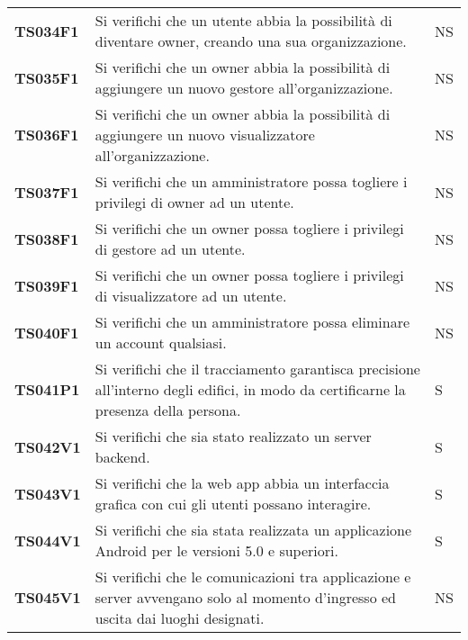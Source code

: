 \documentclass[../piano-di-qualifica.tex]{subfiles}
\begin{document}
\begin{longtable}[H]{>{\centering\bfseries}m{3cm} >{}m{10cm} >{\centering\arraybackslash}m{3cm}}
  TS034F1            & Si verifichi che un utente abbia la possibilità di diventare owner, creando una sua organizzazione.
  & NS               \\

  TS035F1            & Si verifichi che un owner abbia la possibilità di aggiungere un nuovo gestore all'organizzazione.
  & NS               \\

  TS036F1            & Si verifichi che un owner abbia la possibilità di aggiungere un nuovo visualizzatore all'organizzazione.
  & NS               \\

  TS037F1            & Si verifichi che un amministratore possa togliere i privilegi di owner ad un utente.
  & NS              \\

  TS038F1            & Si verifichi che un owner possa togliere i privilegi di gestore ad un utente.
  & NS               \\

  TS039F1            & Si verifichi che un owner possa togliere i privilegi di visualizzatore ad un utente.
  & NS               \\

  TS040F1            & Si verifichi che un amministratore possa eliminare un account qualsiasi.
  & NS               \\


  TS041P1            & Si verifichi che il tracciamento garantisca precisione all’interno degli edifici, in modo da certificarne la presenza della persona.
                     & S               \\

  TS042V1            & Si verifichi che sia stato realizzato un server backend.
                     & S               \\

  TS043V1            & Si verifichi che la web app abbia un interfaccia grafica con cui gli utenti possano interagire.
                     & S               \\

  TS044V1            & Si verifichi che sia stata realizzata un applicazione Android per le versioni 5.0 e superiori.
                     & S               \\

  TS045V1            & Si verifichi che le comunicazioni tra applicazione e server avvengano solo al momento d'ingresso ed uscita dai luoghi designati.
                     & NS                                                                                                                                                                                                                                                             \\


\end{longtable}
\end{document}
